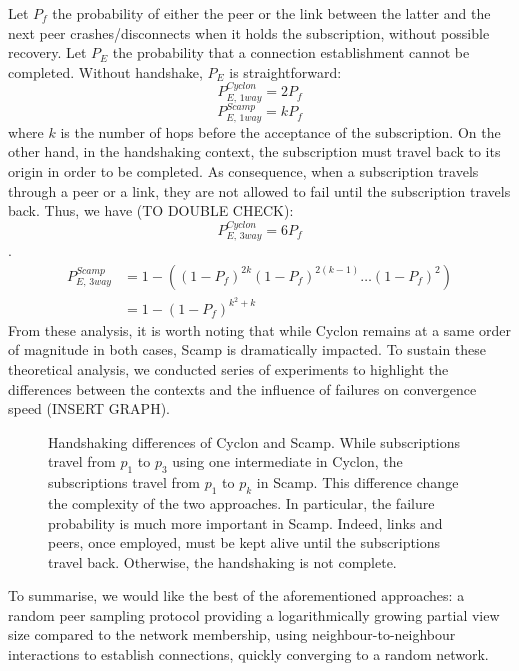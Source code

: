 Let $P_f$ the probability of either the peer or the link between the latter and
the next peer crashes/disconnects when it holds the subscription, without
possible recovery. Let $P_E$ the probability that a connection establishment
cannot be completed. Without handshake, $P_E$ is straightforward:
\begin{equation} P_{E,\,1way}^{Cyclon}=2 P_f \end{equation}
\begin{equation} P_{E,\,1way}^{Scamp}=k P_f \end{equation} where $k$ is the
number of hops before the acceptance of the subscription. On the other hand, in
the handshaking context, the subscription must travel back to its origin in
order to be completed. As consequence, when a subscription travels through a
peer or a link, they are not allowed to fail until the subscription travels
back. Thus, we have (TO DOUBLE CHECK):
\begin{equation} P_{E,\,3way}^{Cyclon}=6 P_f \end{equation}.
\begin{align} P_{E,\,3way}^{Scamp} &=1 - ((1-P_f)^{2k} (1-P_f)^{2(k-1)}
                                     \ldots (1-P_f)^2) \\
                                   &=1-(1-P_f)^{k^2+k}
\end{align}
From these analysis, it is worth noting that while Cyclon remains at a same
order of magnitude in both cases, Scamp is dramatically impacted. To sustain
these theoretical analysis, we conducted series of experiments to highlight the
differences between the contexts and the influence of failures on convergence
speed (INSERT GRAPH).

\begin{figure}
  \centering
  
  \caption{\label{fig:failureexample}Handshaking differences of Cyclon and
    Scamp. While subscriptions travel from $p_1$ to $p_3$ using one
    intermediate in Cyclon, the subscriptions travel from $p_1$ to $p_k$ in
    Scamp. This difference change the complexity of the two approaches. In
    particular, the failure probability is much more important in
    Scamp. Indeed, links and peers, once employed, must be kept alive until the
    subscriptions travel back. Otherwise, the handshaking is not complete.}
\end{figure}

To summarise, we would like the best of the aforementioned approaches: a random
peer sampling protocol providing a logarithmically growing partial view size
compared to the network membership, using neighbour-to-neighbour interactions
to establish connections, quickly converging to a random network.

